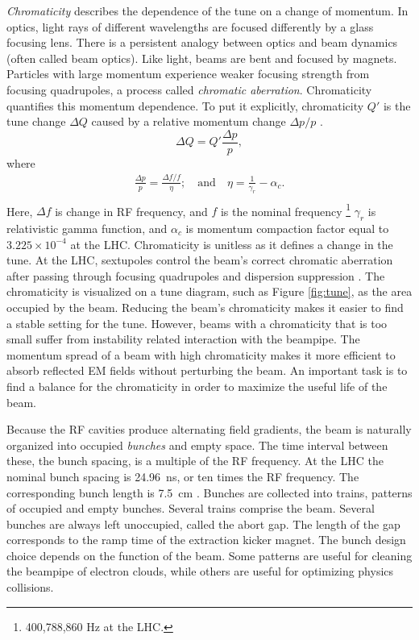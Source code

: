 \emph{Chromaticity} describes the dependence of the tune on a change of momentum.
In optics, light rays of different wavelengths are focused differently by a glass focusing lens.
There is a persistent analogy between optics and beam dynamics (often called beam optics). Like light, beams are bent and focused by magnets. 
Particles with large momentum experience weaker focusing strength from focusing quadrupoles, a process called \emph{chromatic aberration}.
Chromaticity quantifies this momentum dependence.
To put it explicitly, chromaticity $Q'$ is the tune change $\Delta Q$ caused by a relative momentum change $\Delta p/p$ \cite{fuchsberger}.
\begin{equation}
    \Delta Q = Q'\frac{\Delta p}{p},
\end{equation}
where
\begin{equation}
\begin{split}
    \frac{\Delta p}{p} = \frac{\Delta f/f}{\eta}; \quad\text{and}\quad \eta = \frac{1}{\gamma_r}-\alpha_c. \\
\end{split}
\end{equation}
Here, $\Delta f$ is change in RF frequency, and $f$ is the nominal frequency \footnote{400,788,860 Hz at the LHC.} 
$\gamma_r$ is relativistic gamma function, and $\alpha_c$ is momentum compaction factor equal to $3.225\times10^{-4}$ at the LHC.
Chromaticity is unitless as it defines a change in the tune.
At the LHC, sextupoles control the beam's correct chromatic aberration after passing through focusing quadrupoles and dispersion suppression \cite{frascati} \cite{bruno}.
The chromaticity is visualized on a tune diagram, such as Figure \ref{fig:tune}, as the area occupied by the beam.
Reducing the beam's chromaticity makes it easier to find a stable setting for the tune.
However, beams with a chromaticity that is too small suffer from instability related interaction with the beampipe.
The momentum spread of a beam with high chromaticity makes it more efficient to absorb reflected EM fields without perturbing the beam.
An important task is to find a balance for the chromaticity in order to maximize the useful life of the beam.

Because the RF cavities produce alternating field gradients, the beam is naturally organized into occupied \emph{bunches} and empty space.
The time interval between these, the bunch spacing, is a multiple of the RF frequency.
At the LHC the nominal bunch spacing is 24.96~ns, or ten times the RF frequency. The corresponding bunch length is 7.5~cm \cite{boussard}.
Bunches are collected into trains, patterns of occupied and empty bunches.
Several trains comprise the beam.
Several bunches are always left unoccupied, called the abort gap. The length of the gap corresponds to the ramp time of the extraction kicker magnet.
The bunch design choice depends on the function of the beam. Some patterns are useful for cleaning the beampipe of electron clouds, while others are useful for optimizing physics collisions.

